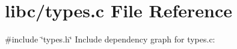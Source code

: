 \hypertarget{a00137}{}\section{libc/types.c File Reference}
\label{a00137}
{\ttfamily \#include \char`\"{}types.\+h\char`\"{}}\newline
Include dependency graph for types.\+c\+:
